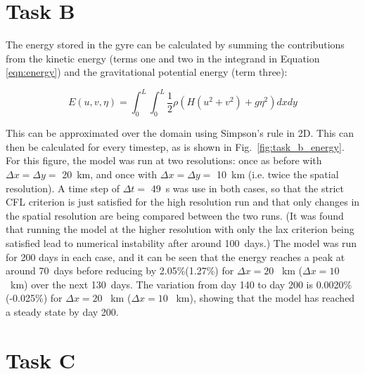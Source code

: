 \documentclass{article}
\begin{document}
\section*{Task B}

The energy stored in the gyre can be calculated by summing the contributions from the kinetic energy
(terms one and two in the integrand in Equation \ref{eqn:energy}) and the gravitational potential
energy (term three):

\begin{equation}
    \label{eqn:energy} 
    E(u, v, \eta) = \int_0^L \int_0^L \frac{1}{2} \rho ( H ( u^2 + v^2) + g \eta^2) dx dy
\end{equation}

This can be approximated over the domain using Simpson's rule in 2D. This can then be calculated for
every timestep, as is shown in Fig.\ \ref{fig:task_b_energy}. For this figure, the model was run at
two resolutions: once as before with $\Delta x = \Delta y = $ \SI{20}{km}, and once with $\Delta x
= \Delta y = $ \SI{10}{km} (i.e. twice the spatial resolution). A time step of $\Delta t = $
\SI{49}{s} was use in both cases, so that the strict CFL criterion is just satisfied for the high
resolution run and that only changes in the spatial resolution are being compared between the two
runs. (It was found that running the model at the higher resolution with only the lax criterion
being satisfied lead to numerical instability after around \SI{100}{days}.) The model was run for 200
days in each case, and it can be seen that the energy reaches a peak at around \SI{70}{days} before
reducing by 2.05\%(1.27\%) for $\Delta x = 20$ \SI{}{km} ($\Delta x = 10$ \SI{}{km}) over the next
\SI{130}{days}. The variation from day 140 to day 200 is 0.0020\% (-0.025\%) for $\Delta x = 20$
\SI{}{km} ($\Delta x = 10$ \SI{}{km}), showing that the model has reached a steady state by day 200.

\section*{Task C}
\end{document}
